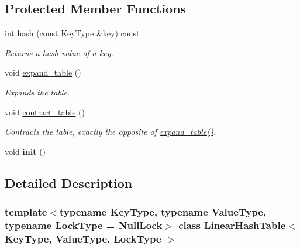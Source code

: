 \subsection*{Protected Member Functions}
\begin{CompactItemize}
\item 
\hypertarget{classLinearHashTable_e69f1092a593508959afc20a8fac7e37}{
int \hyperlink{classLinearHashTable_e69f1092a593508959afc20a8fac7e37}{hash} (const KeyType \&key) const }
\label{classLinearHashTable_e69f1092a593508959afc20a8fac7e37}

\begin{CompactList}\small\item\em Returns a hash value of a key. \item\end{CompactList}\item 
\hypertarget{classLinearHashTable_2eaad3e86cbc65ca346fac49c68c9681}{
void \hyperlink{classLinearHashTable_2eaad3e86cbc65ca346fac49c68c9681}{expand\_\-table} ()}
\label{classLinearHashTable_2eaad3e86cbc65ca346fac49c68c9681}

\begin{CompactList}\small\item\em Expands the table. \item\end{CompactList}\item 
\hypertarget{classLinearHashTable_1f5e14b52ff8aa9a3ee6fce2628dcf01}{
void \hyperlink{classLinearHashTable_1f5e14b52ff8aa9a3ee6fce2628dcf01}{contract\_\-table} ()}
\label{classLinearHashTable_1f5e14b52ff8aa9a3ee6fce2628dcf01}

\begin{CompactList}\small\item\em Contracts the table, exactly the opposite of \hyperlink{classLinearHashTable_2eaad3e86cbc65ca346fac49c68c9681}{expand\_\-table()}. \item\end{CompactList}\item 
\hypertarget{classLinearHashTable_903d29e1f557b251cb00e9b89a303356}{
void \textbf{init} ()}
\label{classLinearHashTable_903d29e1f557b251cb00e9b89a303356}

\end{CompactItemize}


\subsection{Detailed Description}
\subsubsection*{template$<$typename KeyType, typename ValueType, typename LockType = NullLock$>$ class LinearHashTable$<$ KeyType, ValueType, LockType $>$}

